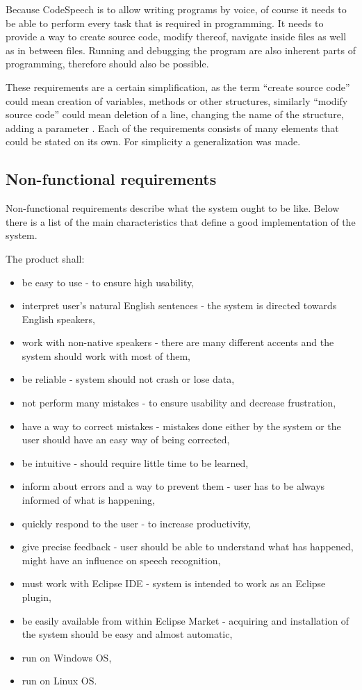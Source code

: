 Because CodeSpeech is to allow writing programs by voice, of course it needs to be able to perform every task that is required in programming. It needs to provide a way to create source code, modify thereof, navigate inside files as well as in between files. Running and debugging the program are also inherent parts of programming, therefore should also be possible.

These requirements are a certain simplification, as \eg the term ``create source code'' could mean creation of variables, methods or other structures, similarly ``modify source code'' could mean deletion of a line, changing the name of the structure, adding a parameter \etc. Each of the requirements consists of many elements that could be stated on its own. For simplicity a generalization was made.

\subsection{Non-functional requirements}
Non-functional requirements describe what the system ought to be like. Below there is a list of the main characteristics that define a good implementation of the system.

The product shall:
\begin{itemize}
  \item be easy to use - to ensure high usability,
  \item interpret user’s natural English sentences - the system is directed towards English speakers,
  \item work with non-native speakers - there are many different accents and the system should work with most of them,
  \item be reliable - system should not crash or lose data,
  \item not perform many mistakes - to ensure usability and decrease frustration,
  \item have a way to correct mistakes - mistakes done either by the system or the user should have an easy way of being corrected,
  \item be intuitive - should require little time to be learned,
  \item inform about errors and a way to prevent them - user has to be always informed of what is happening,
  \item quickly respond to the user - to increase productivity,
  \item give precise feedback - user should be able to understand what has happened, might have an influence on speech recognition,
  \item must work with Eclipse IDE - system is intended to work as an Eclipse plugin,
  \item be easily available from within Eclipse Market - acquiring and installation of the system should be easy and almost automatic, 
  \item run on Windows OS,
  \item run on Linux OS.
\end{itemize}

